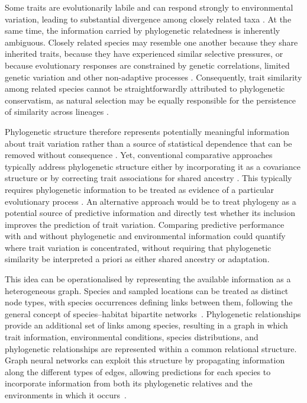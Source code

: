 \documentclass[preprint,12pt,authoryear]{elsarticle}
\begin{document}
Some traits are evolutionarily labile and can respond strongly to environmental variation, leading to substantial divergence among closely related taxa \citep{ackerly2009conservatism, sanchezmartinez2024framework}. At the same time, the information carried by phylogenetic relatedness is inherently ambiguous. Closely related species may resemble one another because they share inherited traits, because they have experienced similar selective pressures, or because evolutionary responses are constrained by genetic correlations, limited genetic variation and other non-adaptive processes \citep{crisp2012phylogenetic, cruznicolas2025combination, gomulkiewicz2009demographic, wiens2010niche}. Consequently, trait similarity among related species cannot be straightforwardly attributed to phylogenetic conservatism, as natural selection may be equally responsible for the persistence of similarity across lineages \citep{westoby2007generalization}. 

Phylogenetic structure therefore represents potentially meaningful information about trait variation rather than a source of statistical dependence that can be removed without consequence \citep{laughlin2023plant}. Yet, conventional comparative approaches typically address phylogenetic structure either by incorporating it as a covariance structure or by correcting trait associations for shared ancestry \citep{felsenstein1985phylogenies, revell2022phylogenetic}. This typically requires phylogenetic information to be treated as evidence of a particular evolutionary process \citep{revell2022phylogenetic}. An alternative approach would be to treat phylogeny as a potential source of predictive information and directly test whether its inclusion improves the prediction of trait variation. Comparing predictive performance with and without phylogenetic and environmental information could quantify where trait variation is concentrated, without requiring that phylogenetic similarity be interpreted a priori as either shared ancestry or adaptation.

This idea can be operationalised by representing the available information as a heterogeneous graph. Species and sampled locations can be treated as distinct node types, with species occurrences defining links between them, following the general concept of species–habitat bipartite networks~\citep{marini_specieshabitat_2019,harrell2025heterogeneous}. Phylogenetic relationships provide an additional set of links among species, resulting in a graph in which trait information, environmental conditions, species distributions, and phylogenetic relationships are represented within a common relational structure. Graph neural networks can exploit this structure by propagating information along the different types of edges, allowing predictions for each species to incorporate information from both its phylogenetic relatives and the environments in which it occurs~\citep{bronstein2021geometric}.
\end{document}
